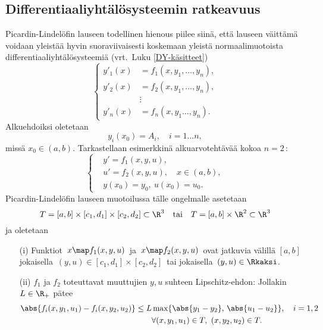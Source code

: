 \pagebreak
\subsection*{Differentiaaliyhtälösysteemin ratkeavuus}

Picardin-Lindelöfin lauseen todellinen hienous piilee siinä, että lauseen väittämä voidaan
yleistää hyvin suoraviivaisesti koskemaan yleistä normaalimuotoista 
differentiaaliyhtälösysteemiä (vrt.\ Luku \ref{DY-käsitteet})
\[ \left\{ \begin{aligned} 
           y'_1(x) &= f_1(x,y_1, \ldots, y_n), \\
           y'_2(x) &= f_2(x,y_1, \ldots, y_n), \\
                  &\vdots \\
           y'_n(x) &= f_n(x,y_1 \ldots, y_n).
           \end{aligned} \right. \]
Alkuehdoiksi oletetaan
\[ 
y_i(x_0) = A_i, \quad i = 1 \ldots n, 
\]
missä $x_0\in(a,b)$. Tarkastellaan esimerkkinä alkuarvotehtävää kokoa $n=2\,$:
\begin{equation} \label{Picard-4}
\left\{ \begin{aligned}
&y' = f_1(x,y,u), \\
&u' = f_2(x,y,u), \quad x\in(a,b), \\
&y(x_0)=y_0,\ u(x_0)=u_0.
        \end{aligned} \right.
\end{equation}
Picardin-Lindelöfin lauseen muotoilussa tälle ongelmalle asetetaan 
\[
T=[a,b]\times[c_1,d_1]\times[c_2,d_2]\subset\R^3 \quad 
        \text{tai} \quad T=[a,b]\times\R^2\subset\R^3
\]
ja oletetaan
\begin{itemize}
\item[(i)]  Funktiot $\,x \map f_1(x,y,u)\,$ ja $\,x \map f_2(x,y,u)\,$ ovat jatkuvia välillä
            $[a,b]$ jokaisella $\,(y,u)\in[c_1,d_1]\times[c_2,d_2]\,$ tai jokaisella
            $\,(y,u)\in\Rkaksi$.
\item[(ii)] $f_1$ ja $f_2$ toteuttavat muuttujien $y,u$ suhteen Lipschitz-ehdon: \newline
            Jollakin $L\in\R_+$ pätee
            \begin{align*}
            \abs{f_i(x,y_1,u_1)-f_i(x,y_2,u_2)} 
                     &\le L\max\{\abs{y_1-y_2},\,\abs{u_1-u_2}\}, \quad i=1,2 \\
                     &\qquad\forall (x,y_1,u_1)\in T, \ (x,y_2,u_2)\in T.
            \end{align*}
\end{itemize}
